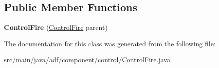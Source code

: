 \subsection*{Public Member Functions}
\begin{DoxyCompactItemize}
\item 
\hypertarget{classadf_1_1component_1_1control_1_1ControlFire_a868120301fcf4b970ef05401798baca6}{}\label{classadf_1_1component_1_1control_1_1ControlFire_a868120301fcf4b970ef05401798baca6} 
{\bfseries Control\+Fire} (\hyperlink{classadf_1_1component_1_1control_1_1ControlFire}{Control\+Fire} parent)
\end{DoxyCompactItemize}


The documentation for this class was generated from the following file\+:\begin{DoxyCompactItemize}
\item 
src/main/java/adf/component/control/Control\+Fire.\+java\end{DoxyCompactItemize}
